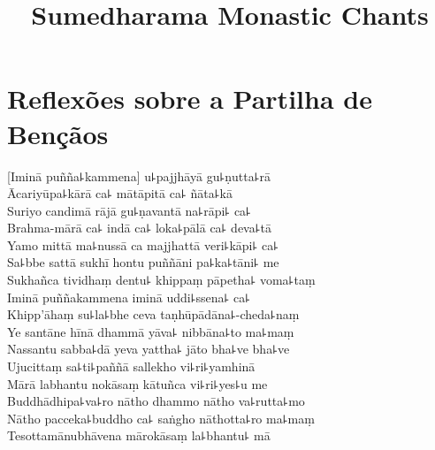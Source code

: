 \documentclass[
  babelLanguage=english,
  final,
  webversion,
]{chantingbook}
\title{Sumedharama Monastic Chants}
\begin{document}
\frontmatter


\thispagestyle{empty}\mbox{}
%
\clearpage

\cleartorecto
\tableofcontents*

\mainmatter

\usePsMarksTitleOnly

\chapter*[Partilha de Bençãos]{Reflexões sobre a Partilha de Bençãos}

\delegateSetUseNext

\begin{leader}
\end{leader}


[Iminā puñña꜕kammena] u꜕pajjhāyā gu꜕ṇutta꜕rā\\
Ācariyūpa꜕kārā ca꜕ mātāpitā ca꜕ ñāta꜕kā\\
Suriyo candimā rājā gu꜕ṇavantā na꜕rāpi꜕ ca꜕\\
Brahma-mārā ca꜕ indā ca꜕ loka꜕pālā ca꜕ deva꜕tā\\
Yamo mittā ma꜕nussā ca majjhattā veri꜕kāpi꜕ ca꜕\\
Sa꜕bbe sattā sukhī hontu puññāni pa꜕ka꜕tāni꜕ me\\
Sukhañca tividhaṃ dentu꜕ khippaṃ pāpetha꜕ voma꜕taṃ\\
Iminā puññakammena iminā uddi꜕ssena꜕ ca꜕\\
Khipp'āhaṃ su꜕la꜕bhe ceva taṇhūpādāna꜕-cheda꜕naṃ\\
Ye santāne hīnā dhammā yāva꜕ nibbāna꜕to ma꜕maṃ\\
Nassantu sabba꜕dā yeva yattha꜕ jāto bha꜕ve bha꜕ve\\
Ujucittaṃ sa꜕ti꜕paññā sallekho vi꜕ri꜕yamhinā\\
Mārā labhantu nokāsaṃ kātuñca vi꜕ri꜕yes꜕u me\\
Buddhādhipa꜕va꜕ro nātho dhammo nātho va꜕rutta꜕mo\\
Nātho pacceka꜕buddho ca꜕ saṅgho nāthotta꜕ro ma꜕maṃ\\
Tesottamānubhāvena mārokāsaṃ la꜕bhantu꜕ mā
\end{document}
